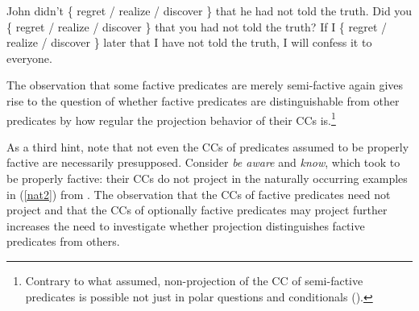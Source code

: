 \documentclass[11pt,fleqn]{article}
\newcommand{\6}{\mbox{$[\hspace*{-.6mm}[$}}
\newcommand{\9}{\mbox{$]\hspace*{-.6mm}]$}}
\begin{document}
\begin{exe}
\ex\label{kart2} \citealt[63f.]{karttunen71b}
\begin{xlist}
\ex John didn't \{ regret / realize / discover \} that he had not told the truth.
\ex  Did you \{ regret / realize / discover \} that you had not told the truth?
\ex  If I \{ regret / realize / discover \} later that I have not told the truth, I will confess it to everyone.
\end{xlist}
\end{exe}
The observation that some factive predicates are merely semi-factive again gives rise to the question of whether factive predicates are distinguishable from other predicates by how regular the projection behavior of their CCs is.\footnote{Contrary to what \citealt{karttunen71b} assumed, non-projection of the CC of semi-factive predicates is possible not just in polar questions and conditionals (\citealt{beaver-belly}).}



As a third hint, note that not even the CCs of predicates assumed to be properly factive are necessarily presupposed. Consider {\em be aware} and {\em know}, which \citet{karttunen71b} took to be properly factive: their CCs do not project in the naturally occurring examples in (\ref{nat2}) from \citealt{beaver-belly}. The observation that the CCs of factive predicates need not project and that the CCs of optionally factive predicates may project further increases the need to investigate whether projection distinguishes factive predicates from others.
\end{document}
